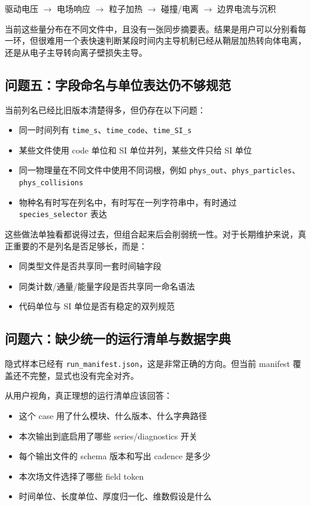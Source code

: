 \documentclass[11pt,a4paper]{ctexart}
\newcommand{\code}[1]{\texttt{#1}}
\newcommand{\file}[1]{\texttt{#1}}
\begin{document}
\begin{center}
驱动电压 $\rightarrow$ 电场响应 $\rightarrow$ 粒子加热 $\rightarrow$ 碰撞/电离 $\rightarrow$ 边界电流与沉积
\end{center}

当前这些量分布在不同文件中，且没有一张同步摘要表。结果是用户可以分别看每一环，但很难用一个表快速判断某段时间内主导机制已经从鞘层加热转向体电离，还是从电子主导转向离子壁损失主导。

\subsection{问题五：字段命名与单位表达仍不够规范}

当前列名已经比旧版本清楚得多，但仍存在以下问题：

\begin{itemize}
  \item 同一时间列有 \code{time\_s}、\code{time\_code}、\code{time\_SI\_s}
  \item 某些文件使用 code 单位和 SI 单位并列，某些文件只给 SI 单位
  \item 同一物理量在不同文件中使用不同词根，例如 \code{phys\_out}、\code{phys\_particles}、\code{phys\_collisions}
  \item 物种名有时写在列名中，有时写在一列字符串中，有时通过 \code{species\_selector} 表达
\end{itemize}

这些做法单独看都说得过去，但组合起来后会削弱统一性。对于长期维护来说，真正重要的不是列名是否足够长，而是：

\begin{itemize}
  \item 同类型文件是否共享同一套时间轴字段
  \item 同类计数/通量/能量字段是否共享同一命名语法
  \item 代码单位与 SI 单位是否有稳定的双列规范
\end{itemize}

\subsection{问题六：缺少统一的运行清单与数据字典}

隐式样本已经有 \file{run\_manifest.json}，这是非常正确的方向。但当前 manifest 覆盖还不完整，显式也没有完全对齐。

从用户视角，真正理想的运行清单应该回答：

\begin{itemize}
  \item 这个 case 用了什么模块、什么版本、什么字典路径
  \item 本次输出到底启用了哪些 series/diagnostics 开关
  \item 每个输出文件的 schema 版本和写出 cadence 是多少
  \item 本次场文件选择了哪些 field token
  \item 时间单位、长度单位、厚度归一化、维数假设是什么
\end{itemize}
\end{document}
